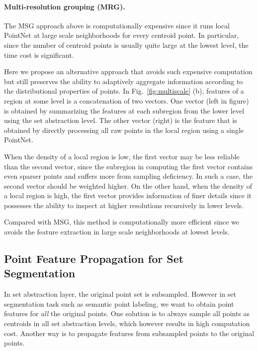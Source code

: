\documentclass{article}
\begin{document}
\vspace{-0.3cm}
\paragraph{Multi-resolution grouping (MRG).} The MSG approach above is computationally expensive since it runs local PointNet at large scale neighborhoods for every centroid point. In particular, since the number of centroid points is usually quite large at the lowest level, the time cost is significant. 

Here we propose an alternative approach that avoids such expensive computation but still preserves the ability to adaptively aggregate information according to the distributional properties of points.
In Fig.~\ref{fig:multiscale} (b), features of a region at some level  is a concatenation of two vectors. One vector (left in figure) is obtained by summarizing the features at each subregion from the lower level  using the set abstraction level. The other vector (right) is the feature that is obtained by directly processing all raw points in the local region using a single PointNet. 

When the density of a local region is low, the first vector may be less reliable than the second vector, since the subregion in computing the first vector contains even sparser points and suffers more from sampling deficiency. In such a case, the second vector should be weighted higher. On the other hand, when the density of a local region is high, the first vector provides information of finer details since it possesses the ability to inspect at higher resolutions recursively in lower levels.



Compared with MSG, this method is computationally more efficient since we avoids the feature extraction in large scale neighborhoods at lowest levels. 
















\vspace{-0.3cm}
\subsection{Point Feature Propagation for Set Segmentation}
In set abstraction layer, the original point set is subsampled. However in set segmentation task such as semantic point labeling, we want to obtain point features for \emph{all} the original points. One solution is to always sample all points as centroids in all set abstraction levels, which however results in high computation cost. Another way is to propagate features from subsampled points to the original points.
\end{document}
